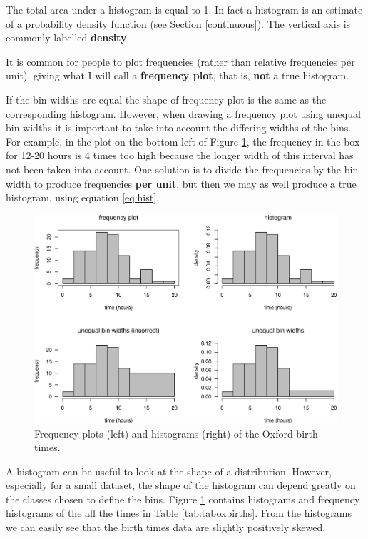 \documentclass[
  11pt,
  british,
  openany, a4paper]{book}
\begin{document}
The total area under a histogram is equal to 1. In fact a histogram is an estimate of a probability density function (see Section \ref{continuous}). The vertical axis is commonly labelled \textbf{density}.

It is common for people to plot frequencies (rather than relative frequencies per unit), giving what I will call a \textbf{frequency plot}, that is, \textbf{not} a true histogram.

If the bin widths are equal the shape of frequency plot is the same as the corresponding histogram. However, when drawing a frequency plot using unequal bin widths it is important to take into account the differing widths of the bins. For example, in the plot on the bottom left of Figure \ref{fig:oxhistbasic}, the frequency in the box for 12-20 hours is 4 times too high because the longer width of this interval has not been taken into account.
One solution is to divide the frequencies by the bin width to produce frequencies \textbf{per unit}, but then we may as well produce a true histogram, using equation \eqref{eq:hist}.

\begin{figure}

{\centering \includegraphics[width=0.75\linewidth]{images/ox_hist_basic} 

}

\caption{Frequency plots (left) and histograms (right) of the Oxford birth times.}\label{fig:oxhistbasic}
\end{figure}

A histogram can be useful to look at the shape of a distribution. However,
especially for a small dataset, the shape of the histogram can depend greatly on the classes chosen to define the bins. Figure \ref{fig:oxhistbasic} contains histograms and frequency histograms of the all the times in Table \ref{tab:taboxbirths}. From the histograms we can easily see that the birth times data are slightly positively skewed.
\end{document}
